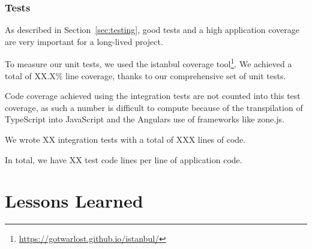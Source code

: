 \subsubsection{Tests}
As described in Section~\ref{sec:testing}, good tests and a high application coverage are very important for a long-lived project.

To measure our unit tests, we used the istanbul coverage tool\footnote{\url{https://gotwarlost.github.io/istanbul/}}. We achieved a total of XX.X\% line coverage, thanks to our comprehensive set of unit tests. %

Code coverage achieved using the integration tests are not counted into this test coverage, as such a number is difficult to compute because of the transpilation of TypeScript into JavaScript and the Angulars use of frameworks like zone.js.

We wrote XX integration tests with a total of XXX lines of code. %

In total, we have XX test code lines per line of application code.  %


\section{Lessons Learned}




